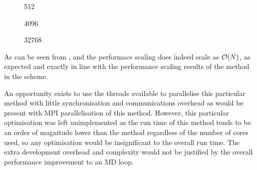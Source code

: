 %
%
\begin{figure}[!h]
    
    \caption{
        \vOneSRTimeCaption
            {\sharedandreplicateddata{}}
            {\individualoperation{}}
            {512}
    }
    \label{fig:v1_shared_and_replicated_individual_operation_512_time}
\end  {figure}

\begin{figure}[!h]
    
    \caption{
        \vOneSRTimeCaption
            {\sharedandreplicateddata{}}
            {\individualoperation{}}
            {4096}
    }
    \label{fig:v1_shared_and_replicated_individual_operation_4096_time}
\end  {figure}

\begin{figure}[!h]
    
    \caption{
        \vOneSRTimeCaption
            {\sharedandreplicateddata{}}
            {\individualoperation{}}
            {32768}
    }
    \label{fig:v1_shared_and_replicated_individual_operation_32768_time}
\end  {figure}

\vOneSRTimeExplanation
    {}
    {}
    {}
    {\individualoperation{}}
    {\replicateddata{}}


%
As can be seen from 
,
 and
the performace scaling does indeed scale as $\mathcal{O}{\left({ N }\right)}$, as expected
and exactly in line with the performance scaling results of the
\individualoperation{} method in the \replicateddata{} scheme.

An opportunity exists to use the \openmp{} threads available to
parallelise this particular method with little synchronisation
and communications overhead as would be present with MPI
parallelisation of this method.
%
However, this particular optimisation was left unimplemented as
the run time of this method tends to be an order of magnitude
lower than the \pairoperation{} method regardless of the
number of cores used, so any optimisation
would be insignificant to the overall run time.
%
The extra development overhead and complexity would not be justified by the
overall performance improvement to an MD loop.



